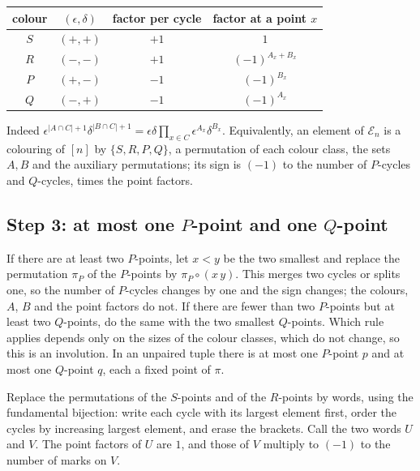 \documentclass[11pt]{amsart}
\theoremstyle{remark}
\begin{document}
\begin{center}
\begin{tabular}{cccc}
\toprule
colour & $(\epsilon,\delta)$ & factor per cycle & factor at a point $x$\\
\midrule
$S$ & $(+,+)$ & $+1$ & $1$\\
$R$ & $(-,-)$ & $+1$ & $(-1)^{A_x+B_x}$\\
$P$ & $(+,-)$ & $-1$ & $(-1)^{B_x}$\\
$Q$ & $(-,+)$ & $-1$ & $(-1)^{A_x}$\\
\bottomrule
\end{tabular}
\end{center}

\noindent Indeed $\epsilon^{|A\cap C|+1}\delta^{|B\cap C|+1}=\epsilon\delta\prod_{x\in C}\epsilon^{A_x}\delta^{B_x}$.
Equivalently, an element of $\mathcal E_n$ is a colouring of $[n]$ by $\{S,R,P,Q\}$, a permutation of each colour
class, the sets $A,B$ and the auxiliary permutations; its sign is $(-1)$ to the number of $P$-cycles and $Q$-cycles,
times the point factors.

\subsection*{Step 3: at most one $P$-point and one $Q$-point}
If there are at least two $P$-points, let $x<y$ be the two smallest and replace the permutation $\pi_P$ of the
$P$-points by $\pi_P\circ(x\,y)$. This merges two cycles or splits one, so the number of $P$-cycles changes by one
and the sign changes; the colours, $A$, $B$ and the point factors do not. If there are fewer than two $P$-points but
at least two $Q$-points, do the same with the two smallest $Q$-points. Which rule applies depends only on the sizes
of the colour classes, which do not change, so this is an involution. In an unpaired tuple there is at most one
$P$-point $p$ and at most one $Q$-point $q$, each a fixed point of $\pi$.

Replace the permutations of the $S$-points and of the $R$-points by words, using the fundamental bijection: write
each cycle with its largest element first, order the cycles by increasing largest element, and erase the brackets.
Call the two words $U$ and $V$. The point factors of $U$ are $1$, and those of $V$ multiply to $(-1)$ to the number
of marks on $V$.
\end{document}
